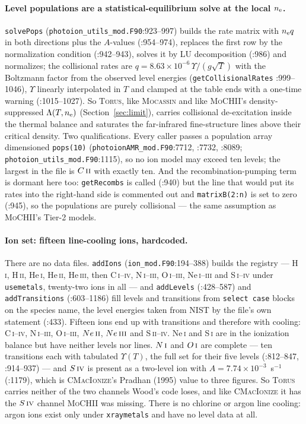 \documentclass[english,a4paper]{my_memo}
\newcommand{\code}[1]{\texttt{#1}}
\newcommand{\MoCHII}{\textsc{MoCHII}}
\newcommand{\Mocassin}{\textsc{Mocassin}}
\newcommand{\CMI}{\textsc{CMacIonize}}
\newcommand{\Torus}{\textsc{Torus}}
\newcommand{\HII}{H\,\textsc{ii}}
\newcommand{\HI}{H\,\textsc{i}}
\newcommand{\HeI}{He\,\textsc{i}}
\newcommand{\HeII}{He\,\textsc{ii}}
\newcommand{\HeIII}{He\,\textsc{iii}}
\newcommand{\OI}{O\,\textsc{i}}
\newcommand{\NI}{N\,\textsc{i}}
\newcommand{\CII}{C\,\textsc{ii}}
\newcommand{\SIV}{S\,\textsc{iv}}
\newcommand{\NeII}{Ne\,\textsc{ii}}
\newcommand{\NeIII}{Ne\,\textsc{iii}}
\newcommand{\nel}{n_{\rm e}}
\begin{document}
\paragraph{Level populations are a statistical-equilibrium solve at the local
$\nel$.}  \code{solvePops} (\code{photoion\_utils\_mod.F90}:923--997) builds
the rate matrix with $\nel q$ in both directions plus the $A$-values
(:954--974), replaces the first row by the normalization condition
(:942--943), solves it by LU decomposition (:986) and normalizes; the
collisional rates are $q = 8.63\times10^{-6}\,\Upsilon/(g\sqrt{T})$ with the
Boltzmann factor from the observed level energies (\code{getCollisionalRates}
:999--1046), $\Upsilon$ linearly interpolated in $T$ and clamped at the table
ends with a one-time warning (:1015--1027).  So \Torus{}, like \Mocassin{} and
like \MoCHII{}'s density-suppressed $\Lambda(T,\nel)$ (Section~\ref{sec:limit}),
carries collisional de-excitation inside the thermal balance and saturates the
far-infrared fine-structure lines above their critical density.  Two
qualifications.  Every caller passes a population array dimensioned
\code{pops(10)} (\code{photoionAMR\_mod.F90}:7712, :7732, :8089;
\code{photoion\_utils\_mod.F90}:1115), so no ion model may exceed ten levels;
the largest in the file is $\CII{}$ with exactly ten.  And the
recombination-pumping term is dormant here too: \code{getRecombs} is called
(:940) but the line that would put its rates into the right-hand side is
commented out and \code{matrixB(2:n)} is set to zero (:945), so the populations
are purely collisional --- the same assumption as \MoCHII{}'s Tier-2 models.

\paragraph{Ion set: fifteen line-cooling ions, hardcoded.}  There are no data
files.  \code{addIons} (\code{ion\_mod.F90}:194--388) builds the registry ---
\HI{}, \HII{}, \HeI{}, \HeII{}, \HeIII{}, then C\,\textsc{i}--\textsc{iv},
N\,\textsc{i}--\textsc{iii}, O\,\textsc{i}--\textsc{iii},
Ne\,\textsc{i}--\textsc{iii} and S\,\textsc{i}--\textsc{iv} under
\code{usemetals}, twenty-two ions in all --- and
\code{addLevels} (:428--587) and \code{addTransitions} (:603--1186) fill levels
and transitions from \code{select case} blocks on the species name, the level
energies taken from NIST by the file's own statement (:433).  Fifteen ions end
up with transitions and therefore with cooling: C\,\textsc{i}--\textsc{iv},
N\,\textsc{i}--\textsc{iii}, O\,\textsc{i}--\textsc{iii}, $\NeII{}$,
$\NeIII{}$ and S\,\textsc{ii}--\textsc{iv}.  Ne\,\textsc{i} and
S\,\textsc{i} are in the ionization balance but have neither levels nor lines.
$\NI{}$ and $\OI{}$ are complete --- ten transitions each with tabulated
$\Upsilon(T)$, the full set for their five levels (:812--847, :914--937) ---
and $\SIV{}$ is present as a two-level ion with
$A = 7.74\times10^{-3}$~s$^{-1}$ (:1179), which is \CMI{}'s Pradhan (1995)
value to three figures.  So \Torus{} carries neither of the two channels
Wood's code loses, and like \CMI{} it has the $\SIV{}$ channel \MoCHII{} was
missing.  There is no chlorine or argon line cooling: argon ions exist only
under \code{xraymetals} and have no level data at all.
\end{document}
